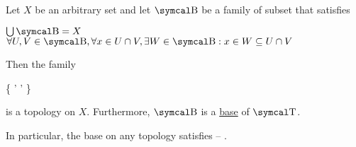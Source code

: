 \begin{proposition}\label{thm:topological_base_axioms}
  Let \( X \) be an arbitrary set and let \( \CB \) be a family of subset that satisfies
  \begin{PropEnum}
     \( \bigcup \CB = X \)
     \( \forall U, V \in \CB, \forall x \in U \cap V, \exists W \in \CB: x \in W \subseteq U \cap V \)
  \end{PropEnum}

  Then the family
  \begin{BreakableAlign}\label{thm:topological_base_axioms/topology}
    \CT \coloneqq \left\{ \bigcup \CB' \colon \CB' \subseteq \CB \right\}
  \end{BreakableAlign}
  is a topology on \( X \). Furthermore, \( \CB \) is a \hyperref[def:topological_base]{base} of \( \CT \).

  In particular, the base on any topology satisfies  -- .
\end{proposition}
